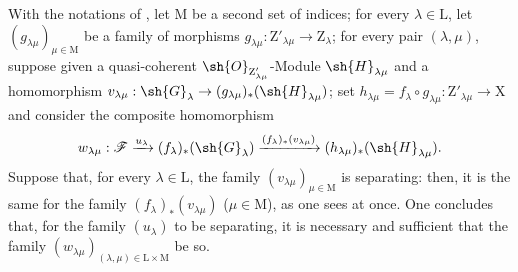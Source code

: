 \begin{env}[11.9.2]
\label{IV.11.9.2}
With the notations of , let $\mathrm{M}$ be a second set of indices; for every $\lambda\in\mathrm{L}$, let $(g_{\lambda\mu})_{\mu\in\mathrm{M}}$ be a family of morphisms $g_{\lambda\mu}:\mathrm{Z}'_{\lambda\mu}\to\mathrm{Z}_\lambda$; for every pair $(\lambda,\mu)$, suppose given a quasi-coherent $\sh{O}_{\mathrm{Z}'_{\lambda\mu}}$-Module $\sh{H}_{\lambda\mu}$ and a homomorphism $v_{\lambda\mu}:\sh{G}_\lambda\to(g_{\lambda\mu})_*(\sh{H}_{\lambda\mu})$; set $h_{\lambda\mu}=f_\lambda\circ g_{\lambda\mu}:\mathrm{Z}'_{\lambda\mu}\to\mathrm{X}$ and consider the composite homomorphism
\[
  w_{\lambda\mu}:\mathscr{F}\xrightarrow{u_\lambda}(f_\lambda)_*(\sh{G}_\lambda)\xrightarrow{(f_\lambda)_*(v_{\lambda\mu})}(h_{\lambda\mu})_*(\sh{H}_{\lambda\mu}).
\]
Suppose that, for every $\lambda\in\mathrm{L}$, the family $(v_{\lambda\mu})_{\mu\in\mathrm{M}}$ is separating: then, it is the same for the family $(f_\lambda)_*(v_{\lambda\mu})$ ($\mu\in\mathrm{M}$), as one sees at once.
One concludes that, for the family $(u_\lambda)$ to be separating, it is necessary and sufficient that the family $(w_{\lambda\mu})_{(\lambda,\mu)\in\mathrm{L}\times\mathrm{M}}$ be so.
\end{env}

